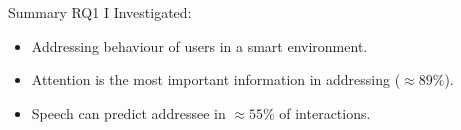 \begin{frame}{Summary RQ1}
  I Investigated:\\
  \begin{itemize}
    \item<1->[\textcolor{mygreen}{\faCheckCircle}] \textcolor{myblue}{Addressing behaviour} of \textcolor{myblue}{\naive{}} users in a smart environment. 
    \item<2->[\textcolor{mygreen}{\faCheckCircle}] \textcolor{myblue}{Attention} is the most important information in addressing (\(\approx 89\%\)).
    \item<3->[\textcolor{mygreen}{\faCheckCircle}] \textcolor{myblue}{Speech} can predict addressee in \(\approx 55\%\) of interactions.
  \end{itemize}
\end{frame}
